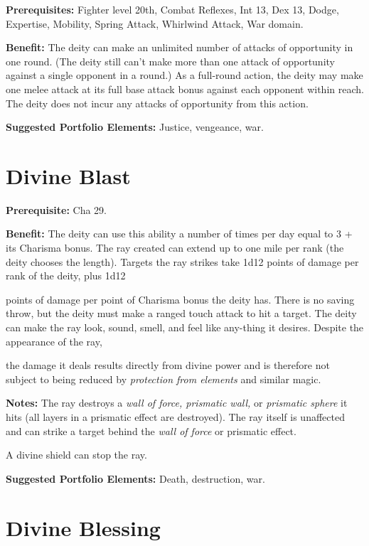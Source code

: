 \documentclass{article}
\begin{document}
\textbf{Prerequisites:} Fighter level 20th, Combat Reflexes, Int 13, Dex 13, Dodge, 
Expertise, Mobility, Spring Attack, Whirlwind Attack, War domain.

\textbf{Benefit:} The deity can make an unlimited number of attacks of opportunity 
in one round. (The deity still can't make more than one attack of opportunity against 
a single opponent in a round.) As a full-round action, the deity may make one melee 
attack at its full base attack bonus against each opponent within reach. The deity 
does not incur any attacks of opportunity from this action.

\textbf{Suggested Portfolio Elements:} Justice, vengeance, war.

\vspace{12pt}
\section*{Divine Blast}

\textbf{Prerequisite:} Cha 29.

\textbf{Benefit:} The deity can use this ability a number of times per day equal 
to 3 + its Charisma bonus. The ray created can extend up to one mile per rank (the 
deity chooses the length). Targets the ray strikes take 1d12 points of damage per 
rank of the deity, plus 1d12

points of damage per point of Charisma bonus the deity has. There is no saving 
throw, but the deity must make a ranged touch attack to hit a target. The deity 
can make the ray look, sound, smell, and feel like any-thing it desires. Despite 
the appearance of the ray,

the damage it deals results directly from divine power and is therefore not subject 
to being reduced by \textit{protection from elements }and similar magic.

\textbf{Notes:} The ray destroys a \textit{wall of force, prismatic wall, }or \textit{prismatic 
sphere }it hits (all layers in a prismatic effect are destroyed). The ray itself 
is unaffected and can strike a target behind the \textit{wall of force }or prismatic 
effect.

A divine shield can stop the ray.

\textbf{Suggested Portfolio Elements:} Death, destruction, war.

\vspace{12pt}
\section*{Divine Blessing}
\end{document}
